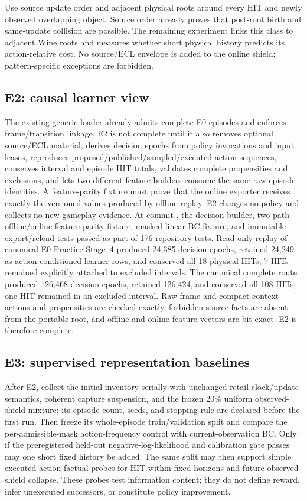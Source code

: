 \documentclass[11pt]{article}
\begin{document}
Use source update order and adjacent physical roots around every HIT and newly
observed overlapping object.  Source order already proves that post-root birth
and same-update collision are possible.  The remaining experiment links this
class to adjacent Wine roots and measures whether short physical history
predicts its action-relative cost.  No source/ECL envelope is added to the
online shield; pattern-specific exceptions are forbidden.

\subsection{E2: causal learner view}

The existing generic loader already admits complete E0 episodes and enforces
frame/transition linkage.  E2 is not complete until it also removes optional
source/ECL material, derives decision epochs from policy invocations and input
leases, reproduces proposed/published/sampled/executed action sequences,
conserves interval and episode HIT totals, validates complete propensities and
exclusions, and lets two different feature builders consume the same raw
episode identities.  A feature-parity fixture must prove that the online
exporter receives exactly the versioned values produced by offline replay.
E2 changes no policy and collects no new gameplay evidence.  At commit
, the decision builder,
two-path offline/online feature-parity fixture, masked linear BC fixture, and
immutable export/reload tests passed as part of 176 repository tests.  Read-only
replay of canonical E0 Practice Stage~4 produced 24,385 decision epochs,
retained 24,249 as action-conditioned learner rows, and conserved all 18
physical HITs; 7 HITs remained explicitly attached to excluded intervals.
The canonical complete route produced 126,468 decision epochs, retained
126,424, and conserved all 108 HITs; one HIT remained in an excluded interval.
Raw-frame and compact-context actions and propensities are checked exactly,
forbidden source facts are absent from the portable root, and offline and
online feature vectors are bit-exact.  E2 is therefore complete.

\subsection{E3: supervised representation baselines}

After E2, collect the initial inventory serially with unchanged retail
clock/update semantics, coherent capture suspension, and the frozen 20\%
uniform observed-shield mixture; its episode count, seeds, and stopping rule are
declared before the first run.  Then freeze its whole-episode train/validation
split and compare the per-admissible-mask action-frequency
control with current-observation BC.  Only if the preregistered held-out
negative-log-likelihood and calibration gate passes may one short fixed history
be added.  The same split may then support simple executed-action factual probes
for HIT within fixed horizons and future observed-shield collapse.  These
probes test information content; they do not define reward, infer unexecuted
successors, or constitute policy improvement.
\end{document}
